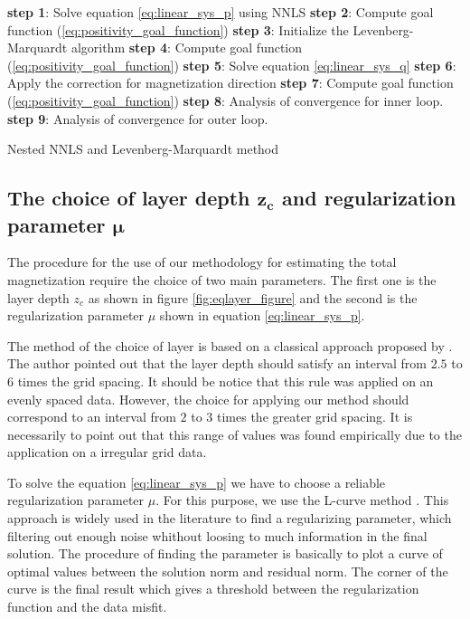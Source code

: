 \begin{algorithm}[H]
	
	{ \textbf{step 1}: Solve equation \ref{eq:linear_sys_p} using NNLS \;
	  \textbf{step 2}: Compute goal function (\ref{eq:positivity_goal_function}) \; 
		{ \textbf{step 3}:  Initialize the Levenberg-Marquardt algorithm \;  
		  \textbf{step 4}: Compute goal function (\ref{eq:positivity_goal_function})\;
			 {
				\textbf{step 5}:  Solve equation \ref{eq:linear_sys_q} \;
				\textbf{step 6}:  Apply the correction for magnetization direction \;
				\textbf{step 7}: Compute goal function (\ref{eq:positivity_goal_function})\;
			}
			\textbf{step 8}:  Analysis of convergence for inner loop.}
			\textbf{step 9}:  Analysis of convergence for outer loop.}
		
		\caption{Nested NNLS and Levenberg-Marquardt method}
		\label{cd: LM_NNLS}
	\end{algorithm}

\subsection{The choice of layer depth $\mathbf{z_c}$ and regularization parameter $\mathbf{\mu}$}

The procedure for the use of our methodology for estimating the total magnetization require the choice of two main parameters. The first one is the layer depth $z_c$ as shown in figure \ref{fig:eqlayer_figure} and the second is the regularization parameter $\mu$ shown in equation \ref{eq:linear_sys_p}.

The method of the choice of layer is based on a classical approach proposed by \cite{dampney1969}. The author pointed out that the layer depth should satisfy an interval from $2.5$ to $6$ times the grid spacing. It should be notice that this rule was applied on an evenly spaced data. However, the choice for applying our method should correspond to an interval from $2$ to $3$ times the greater grid spacing. It is necessarily to point out that this range of values was found empirically due to the application on a irregular grid data.

To solve the equation \ref{eq:linear_sys_p} we have to choose a reliable regularization parameter $\mu$. For this purpose, we use the L-curve method \citep{hansen1992}. This approach is widely used in the literature to find a regularizing parameter, which filtering out enough noise whithout loosing to much information in the final solution. The procedure of finding the parameter is basically to plot a curve of optimal values between the solution norm and residual norm. The corner of the curve is the final result which gives a threshold between the regularization function and the data misfit.
